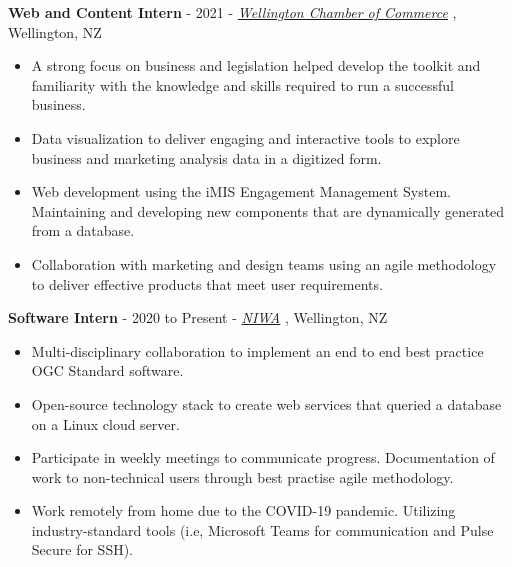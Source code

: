\documentclass[9pt]{developercv}
\begin{document}
\textbf{Web and Content Intern} - 2021 - \emph{\href{https://www.wecc.org.nz/}{Wellington Chamber of Commerce}} , Wellington, NZ
\begin{itemize}
    \item A strong focus on business and legislation helped develop the toolkit and familiarity with the knowledge and skills required to run a successful business.
    \item Data visualization to deliver engaging and interactive tools to explore business and marketing analysis data in a digitized form. 
    \item Web development using the iMIS Engagement Management System. Maintaining and developing new components that are dynamically generated from a database. 
    \item Collaboration with marketing and design teams using an agile methodology to deliver effective products that meet user requirements.
\end{itemize}

\textbf{Software Intern} - 2020 to Present - \emph{\href{https://niwa.co.nz/}{NIWA}} , Wellington, NZ
\begin{itemize}
    \item Multi-disciplinary collaboration to implement an end to end best practice OGC Standard software.
    \item Open-source technology stack to create web services that queried a database on a Linux cloud server.
    \item Participate in weekly meetings to communicate progress. Documentation of work to non-technical users through best practise agile methodology.
    \item Work remotely from home due to the COVID-19 pandemic. Utilizing industry-standard tools (i.e, Microsoft Teams for communication and Pulse Secure for SSH).
\end{itemize}
\end{document}
